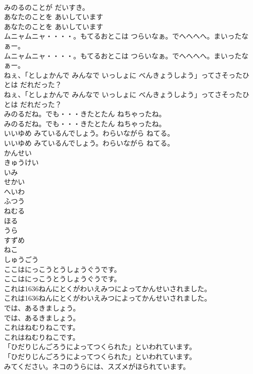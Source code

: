 \documentclass[8pt]{extreport}
\begin{document}
\begin{CJK}{UTF8}{min}
\\	みのるのことが だいすき。
\\	あなたのことを あいしています
\\	あなたのことを あいしています
\\	ムニャムニャ・・・・。もてるおとこは つらいなぁ。でへへへへ。まいったなぁー。
\\	ムニャムニャ・・・・。もてるおとこは つらいなぁ。でへへへへ。まいったなぁー。
\\	ねぇ、「としょかんで みんなで いっしょに べんきょうしよう」ってさそったひとは だれだった？
\\	ねぇ、「としょかんで みんなで いっしょに べんきょうしよう」ってさそったひとは だれだった？
\\	みのるだね。でも・・・きたとたん ねちゃったね。
\\	みのるだね。でも・・・きたとたん ねちゃったね。
\\	いいゆめ みているんでしょう。わらいながら ねてる。
\\	いいゆめ みているんでしょう。わらいながら ねてる。
\\	かんせい
\\	きゅうけい
\\	いみ
\\	せかい
\\	へいわ
\\	ふつう
\\	ねむる
\\	ほる
\\	うら
\\	すずめ
\\	ねこ
\\	しゅうごう
\\	ここはにっこうとうしょうぐうです。
\\	ここはにっこうとうしょうぐうです。
\\	これは1636ねんにとくがわいえみつによってかんせいされました。
\\	これは1636ねんにとくがわいえみつによってかんせいされました。
\\	では、あるきましょう。
\\	では、あるきましょう。
\\	これはねむりねこです。
\\	これはねむりねこです。
\\	「ひだりじんごろうによってつくられた」といわれています。
\\	「ひだりじんごろうによってつくられた」といわれています。
\\	みてください。ネコのうらには、スズメがほられています。

\end{CJK}
\end{document}
